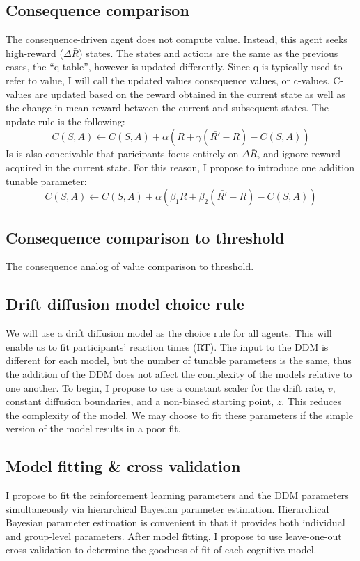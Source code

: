 \documentclass[11pt]{article}
\begin{document}
\subsection{Consequence comparison}
\label{sec:orga6edcf1}
The consequence-driven agent does not compute value. Instead, this agent seeks high-reward (\(\Delta\bar{R}\)) states.
The states and actions are the same as the previous cases, the ``q-table'', however is updated differently. Since q is typically used to refer to value, I will call the updated values consequence values, or c-values. C-values are updated based on the reward obtained in the current state as well as the change in mean reward between the current and subsequent states.
The update rule is the following:
\begin{equation}
C(S, A) \gets C(S, A) + \alpha (R + \gamma (\bar{R'} - \bar{R}) - C(S, A))
\end{equation}
Is is also conceivable that paricipants focus entirely on \(\Delta\bar{R}\), and ignore reward acquired in the current state. For this reason, I propose to introduce one addition tunable parameter:
\begin{equation}
C(S, A) \gets C(S, A) + \alpha (\beta_1 R + \beta_2 (\bar{R'} - \bar{R}) - C(S, A))
\end{equation}
\subsection{Consequence comparison to threshold}
\label{sec:orgeb92600}
The consequence analog of value comparison to threshold.
\subsection{Drift diffusion model choice rule}
\label{sec:org807069f}
We will use a drift diffusion model as the choice rule for all agents. This will enable us to fit participants' reaction times (RT). The input to the DDM is different for each model, but the number of tunable parameters is the same, thus the addition of the DDM does not affect the complexity of the models relative to one another. To begin, I propose to use a constant scaler for the drift rate, \(v\), constant diffusion boundaries, and a non-biased starting point, \(z\). This reduces the complexity of the model. We may choose to fit these parameters if the simple version of the model results in a poor fit.
\subsection{Model fitting \& cross validation}
\label{sec:orgfa1c781}
I propose to fit the reinforcement learning parameters and the DDM parameters simultaneously via hierarchical Bayesian parameter estimation. Hierarchical Bayesian parameter estimation is convenient in that it provides both individual and group-level parameters.
After model fitting, I propose to use leave-one-out cross validation to determine the goodness-of-fit of each cognitive model.
\end{document}
